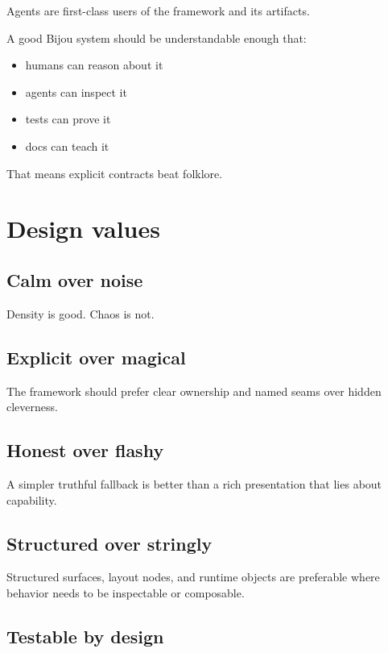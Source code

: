 Agents are first-class users of the framework and its artifacts.

A good Bijou system should be understandable enough that:

\begin{itemize}
\tightlist
\item
  humans can reason about it
\item
  agents can inspect it
\item
  tests can prove it
\item
  docs can teach it
\end{itemize}

That means explicit contracts beat folklore.

\section{Design values}\label{record-035-design-values}

\subsection{Calm over noise}\label{record-035-calm-over-noise}

Density is good. Chaos is not.

\subsection{Explicit over magical}\label{record-035-explicit-over-magical}

The framework should prefer clear ownership and named seams over hidden cleverness.

\subsection{Honest over flashy}\label{record-035-honest-over-flashy}

A simpler truthful fallback is better than a rich presentation that lies about capability.

\subsection{Structured over stringly}\label{record-035-structured-over-stringly}

Structured surfaces, layout nodes, and runtime objects are preferable where behavior needs to be inspectable or composable.

\subsection{Testable by design}\label{record-035-testable-by-design}

